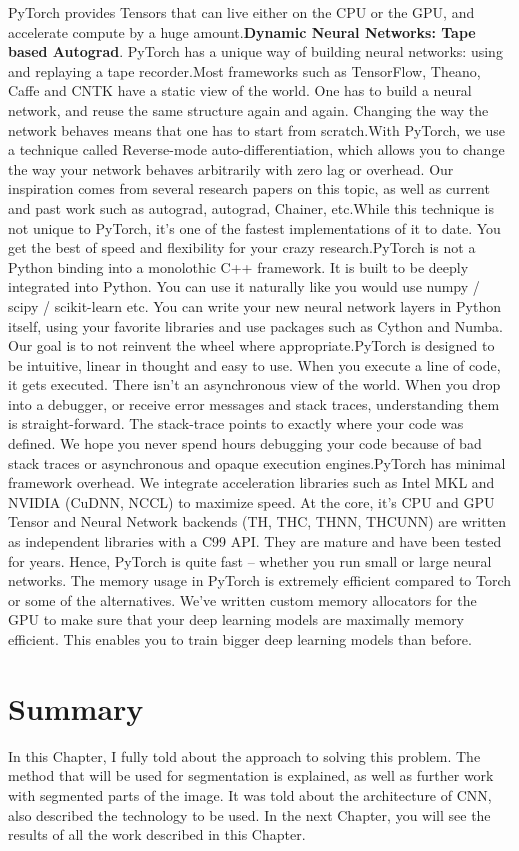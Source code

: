 \par PyTorch provides Tensors that can live either on the CPU or the GPU, and accelerate compute by a huge amount.\textbf{Dynamic Neural Networks: Tape based Autograd}. PyTorch has a unique way of building neural networks: using and replaying a tape recorder.Most frameworks such as TensorFlow, Theano, Caffe and CNTK have a static view of the world. One has to build a neural network, and reuse the same structure again and again. Changing the way the network behaves means that one has to start from scratch.With PyTorch, we use a technique called Reverse-mode auto-differentiation, which allows you to change the way your network behaves arbitrarily with zero lag or overhead. Our inspiration comes from several research papers on this topic, as well as current and past work such as autograd, autograd, Chainer, etc.While this technique is not unique to PyTorch, it’s one of the fastest implementations of it to date. You get the best of speed and flexibility for your crazy research.PyTorch is not a Python binding into a monolothic C++ framework. It is built to be deeply integrated into Python. You can use it naturally like you would use numpy / scipy / scikit-learn etc. You can write your new neural network layers in Python itself, using your favorite libraries and use packages such as Cython and Numba. Our goal is to not reinvent the wheel where appropriate.PyTorch is designed to be intuitive, linear in thought and easy to use. When you execute a line of code, it gets executed. There isn’t an asynchronous view of the world. When you drop into a debugger, or receive error messages and stack traces, understanding them is straight-forward. The stack-trace points to exactly where your code was defined. We hope you never spend hours debugging your code because of bad stack traces or asynchronous and opaque execution engines.PyTorch has minimal framework overhead. We integrate acceleration libraries such as Intel MKL and NVIDIA (CuDNN, NCCL) to maximize speed. At the core, it’s CPU and GPU Tensor and Neural Network backends (TH, THC, THNN, THCUNN) are written as independent libraries with a C99 API.
They are mature and have been tested for years.
Hence, PyTorch is quite fast – whether you run small or large neural networks.
The memory usage in PyTorch is extremely efficient compared to Torch or some of the alternatives. We’ve written custom memory allocators for the GPU to make sure that your deep learning models are maximally memory efficient. This enables you to train bigger deep learning models than before.


\section{Summary}\label{sec:4.4}
\par In this Chapter, I fully told about the approach to solving this problem. The method that will be used for segmentation is explained, as well as further work with segmented parts of the image. It was told about the architecture of CNN, also described the technology to be used. In the next Chapter, you will see the results of all the work described in this Chapter.